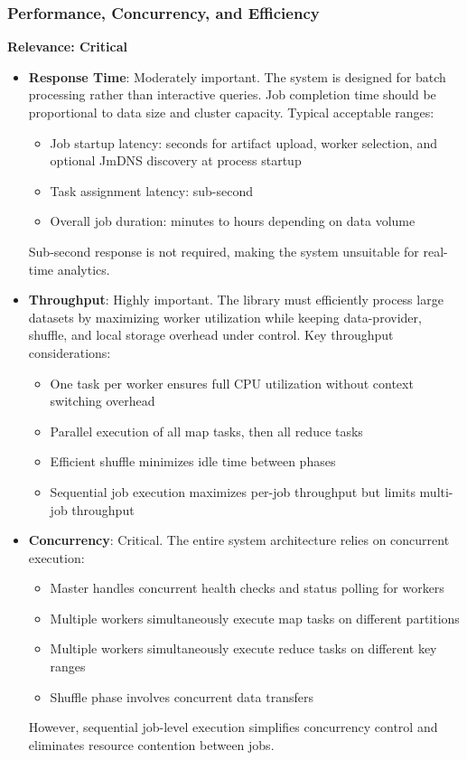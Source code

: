 \documentclass{scrartcl}
\begin{document}
\subsubsection{Performance, Concurrency, and Efficiency}

\textbf{Relevance: Critical}

\begin{itemize}
    \item \textbf{Response Time}: Moderately important. The system is designed for batch processing rather than interactive queries. Job completion time should be proportional to data size and cluster capacity. Typical acceptable ranges:
          \begin{itemize}
              \item Job startup latency: seconds for artifact upload, worker selection, and optional JmDNS discovery at process startup
              \item Task assignment latency: sub-second
              \item Overall job duration: minutes to hours depending on data volume
          \end{itemize}
          Sub-second response is not required, making the system unsuitable for real-time analytics.

    \item \textbf{Throughput}: Highly important. The library must efficiently process large datasets by maximizing worker utilization while keeping data-provider, shuffle, and local storage overhead under control. Key throughput considerations:
          \begin{itemize}
              \item One task per worker ensures full CPU utilization without context switching overhead
              \item Parallel execution of all map tasks, then all reduce tasks
              \item Efficient shuffle minimizes idle time between phases
              \item Sequential job execution maximizes per-job throughput but limits multi-job throughput
          \end{itemize}

    \item \textbf{Concurrency}: Critical. The entire system architecture relies on concurrent execution:
          \begin{itemize}
              \item Master handles concurrent health checks and status polling for workers
              \item Multiple workers simultaneously execute map tasks on different partitions
              \item Multiple workers simultaneously execute reduce tasks on different key ranges
              \item Shuffle phase involves concurrent data transfers
          \end{itemize}
          However, sequential job-level execution simplifies concurrency control and eliminates resource contention between jobs.


\end{itemize}
\end{document}
